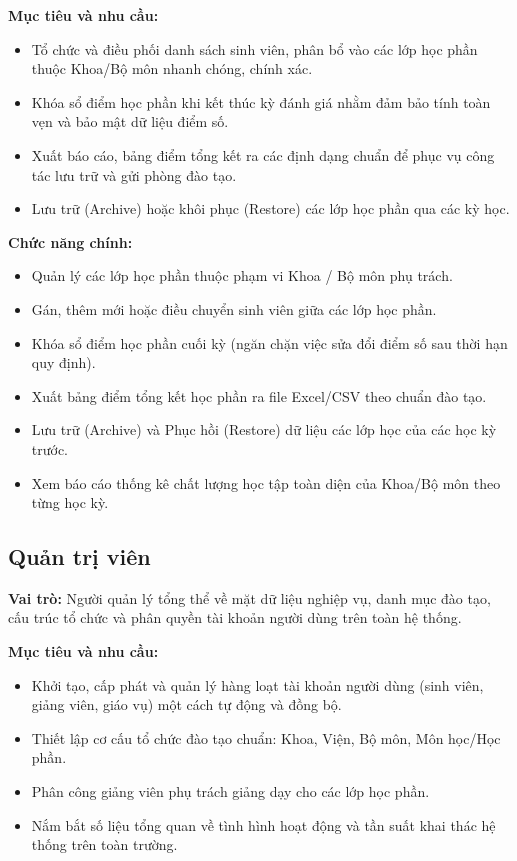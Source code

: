 \documentclass[12pt,a4paper,oneside]{report}
\begin{document}
\noindent\textbf{Mục tiêu và nhu cầu:}
\begin{itemize}
  \item Tổ chức và điều phối danh sách sinh viên, phân bổ vào các lớp học phần thuộc Khoa/Bộ môn nhanh chóng, chính xác.
  \item Khóa sổ điểm học phần khi kết thúc kỳ đánh giá nhằm đảm bảo tính toàn vẹn và bảo mật dữ liệu điểm số.
  \item Xuất báo cáo, bảng điểm tổng kết ra các định dạng chuẩn để phục vụ công tác lưu trữ và gửi phòng đào tạo.
  \item Lưu trữ (Archive) hoặc khôi phục (Restore) các lớp học phần qua các kỳ học.
\end{itemize}

\noindent\textbf{Chức năng chính:}
\begin{itemize}
  \item Quản lý các lớp học phần thuộc phạm vi Khoa / Bộ môn phụ trách.
  \item Gán, thêm mới hoặc điều chuyển sinh viên giữa các lớp học phần.
  \item Khóa sổ điểm học phần cuối kỳ (ngăn chặn việc sửa đổi điểm số sau thời hạn quy định).
  \item Xuất bảng điểm tổng kết học phần ra file Excel/CSV theo chuẩn đào tạo.
  \item Lưu trữ (Archive) và Phục hồi (Restore) dữ liệu các lớp học của các học kỳ trước.
  \item Xem báo cáo thống kê chất lượng học tập toàn diện của Khoa/Bộ môn theo từng học kỳ.
\end{itemize}

\subsection{Quản trị viên}
\textbf{Vai trò:} Người quản lý tổng thể về mặt dữ liệu nghiệp vụ, danh mục đào tạo, cấu trúc tổ chức và phân quyền tài khoản người dùng trên toàn hệ thống.

\noindent\textbf{Mục tiêu và nhu cầu:}
\begin{itemize}
  \item Khởi tạo, cấp phát và quản lý hàng loạt tài khoản người dùng (sinh viên, giảng viên, giáo vụ) một cách tự động và đồng bộ.
  \item Thiết lập cơ cấu tổ chức đào tạo chuẩn: Khoa, Viện, Bộ môn, Môn học/Học phần.
  \item Phân công giảng viên phụ trách giảng dạy cho các lớp học phần.
  \item Nắm bắt số liệu tổng quan về tình hình hoạt động và tần suất khai thác hệ thống trên toàn trường.
\end{itemize}
\end{document}
